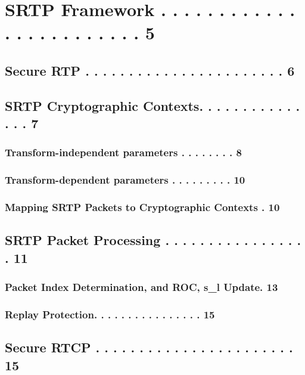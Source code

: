 \documentclass{article}
\begin{document}
\section{SRTP Framework . . . . . . . . . . . . . . . . . . . . . . . .  5}

\subsection{Secure RTP . . . . . . . . . . . . . . . . . . . . . . .  6}

\subsection{SRTP Cryptographic Contexts. . . . . . . . . . . . . . .  7}

\subsubsection{Transform-independent parameters . . . . . . . .  8}

\subsubsection{Transform-dependent parameters . . . . . . . . . 10}

\subsubsection{Mapping SRTP Packets to Cryptographic Contexts . 10}

\subsection{SRTP Packet Processing . . . . . . . . . . . . . . . . . 11}

\subsubsection{Packet Index Determination, and ROC, s\_l Update. 13}

\subsubsection{Replay Protection. . . . . . . . . . . . . . . . 15}

\subsection{Secure RTCP . . . . . . . . . . . . . . . . . . . . . . . 15}
\end{document}
